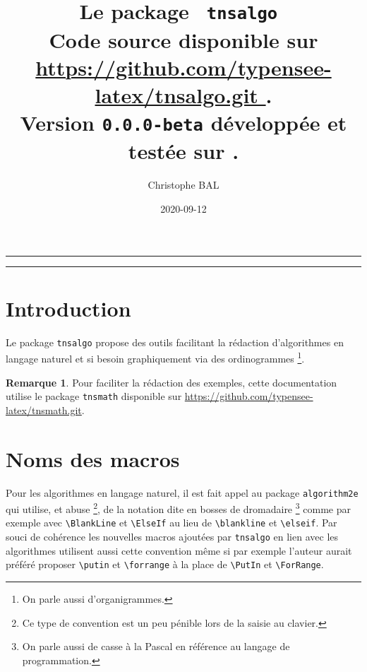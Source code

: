 \documentclass[12pt,a4paper]{article}
\theoremstyle{definition}
\newtheorem*{remark}{Remarque}
\newcommand\env[1]{\texttt{#1}}
\newcommand\macro[1]{\env{\textbackslash{}#1}}
\begin{document}
\renewcommand\labelitemi{\raisebox{0.125em}{\tiny\textbullet}}
\renewcommand{\labelitemii}{---}

\title{   %
	Le package \texttt{ tnsalgo }\\%
	{\footnotesize Code source disponible sur \url{ https://github.com/typensee-latex/tnsalgo.git }.}\\%
{\footnotesize Version \texttt{0.0.0-beta} développée et testée sur \macosxname{}.}%
}
\author{Christophe BAL}
\date{2020-09-12}

\maketitle


\vspace{2em}

\hrule

\tableofcontents

\vspace{1.5em}

\hrule

\newpage

\section{Introduction}

Le package \verb#tnsalgo# propose des outils facilitant la rédaction d'algorithmes en langage naturel et si besoin graphiquement via des ordinogrammes
\footnote{
	On parle aussi d'organigrammes.
}.


\begin{remark}
	Pour faciliter la rédaction des exemples, cette documentation utilise le package \verb#tnsmath# disponible sur \url{https://github.com/typensee-latex/tnsmath.git}.
\end{remark}
\section{Noms des macros}


Pour les algorithmes en langage naturel, il est fait appel au package \verb#algorithm2e# qui utilise, et abuse
\footnote{
	Ce type de convention est un peu pénible lors de la saisie au clavier.
},
de la notation dite en bosses de dromadaire
\footnote{
	 On parle aussi de casse à la Pascal en référence au langage de programmation.
}
comme par exemple avec \macro{BlankLine} et \macro{ElseIf} au lieu de \macro{blankline} et \macro{elseif}.
Par souci de cohérence les nouvelles macros ajoutées par \verb#tnsalgo# en lien avec les algorithmes utilisent aussi cette convention même si par exemple l'auteur aurait préféré proposer \macro{putin} et \macro{forrange} à la place de \macro{PutIn} et \macro{ForRange}.
\end{document}

